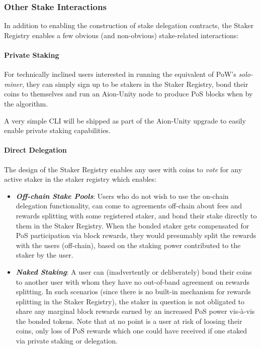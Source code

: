 \subsubsection{Other Stake Interactions} \label{staker_reg_interactions}

In addition to enabling the construction of stake delegation contracts, the Staker Registry enables a few obvious (and non-obvious) stake-related interactions:

\paragraph{Private Staking}
For technically inclined users interested in running the equivalent of PoW's \textit{solo-miner}, they can simply sign up to be stakers in the Staker Registry, bond their coins to themselves and run an Aion-Unity node to produce PoS blocks when  by the algorithm. 

A very simple CLI will be shipped as part of the Aion-Unity upgrade to easily enable private staking capabilities. 

\paragraph{Direct Delegation}
The design of the Staker Registry enables any user with coins to \textit{vote} for any active staker in the staker registry which enables:
\begin{itemize}
    \item \textbf{\textit{Off-chain Stake Pools}}: Users who do not wish to use the on-chain delegation functionality, can come to agreements off-chain about fees and rewards splitting with some registered staker, and bond their stake directly to them in the Staker Registry. When the bonded staker gets compensated for PoS participation via block rewards, they would presumably split the rewards with the users (off-chain), based on the staking power contributed to the staker by the user. 
    
    \item \textbf{\textit{Naked Staking}}: A user can (inadvertently or deliberately) bond their coins to another user with whom they have no out-of-band agreement on rewards splitting. In such scenarios (since there is no built-in mechanism for rewards splitting in the Staker Registry), the staker in question is not obligated to share any marginal block rewards earned by an increased PoS power vis-à-vis the  bonded tokens. Note that at no point is a user at risk of loosing their coins, only loss of PoS rewards which one could have received if one staked via private staking or delegation. 
\end{itemize}

